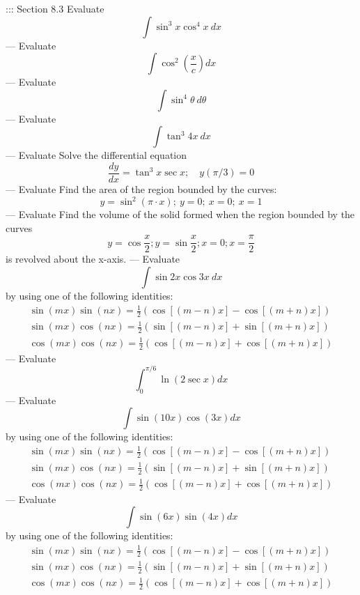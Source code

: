 ::: Section 8.3
Evaluate
\[\int\sin^3 x\cos^4 x\ dx\]
---
Evaluate
\[\int\cos^2\left(\frac{x}{c}\right)dx\]
---
Evaluate
\[\int\sin^4\theta\ d\theta\]
---
Evaluate
\[\int\tan^3 4x\ dx\]
---
Evaluate
Solve the differential equation
\[\frac{dy}{dx}=\tan^3 x\sec x;\quad y(\pi/3)=0\]
---
Evaluate
Find the area of the region bounded by the curves:
\[y=\sin^2(\pi\cdot x);\ y=0;\ x=0;\ x=1\]
---
Evaluate
Find the volume of the solid formed when the region bounded by the curves
\[y=\cos\frac{x}{2};y=\sin\frac{x}{2};x=0;x=\frac{\pi}{2}\]
is revolved about the x-axis.
---
Evaluate
\[\int\sin 2x\cos 3x\ dx\]
by using one of the following identities:
\begin{gather*}
\sin(mx)\sin(nx)=\frac{1}{2}(\cos[(m-n)x]-\cos[(m+n)x])\\
\sin(mx)\cos(nx)=\frac{1}{2}(\sin[(m-n)x]+\sin[(m+n)x])\\
\cos(mx)\cos(nx)=\frac{1}{2}(\cos[(m-n)x]+\cos[(m+n)x])
\end{gather*}
---
Evaluate
\[\int_0^{\pi/6}\ln(2\sec x)dx\]
---
Evaluate
\[\int\sin(10x)\cos(3x)dx\]
by using one of the following identities:
\begin{gather*}
\sin(mx)\sin(nx)=\frac{1}{2}(\cos[(m-n)x]-\cos[(m+n)x])\\
\sin(mx)\cos(nx)=\frac{1}{2}(\sin[(m-n)x]+\sin[(m+n)x])\\
\cos(mx)\cos(nx)=\frac{1}{2}(\cos[(m-n)x]+\cos[(m+n)x])
\end{gather*}
---
Evaluate
\[\int\sin(6x)\sin(4x)dx\]
by using one of the following identities:
\begin{gather*}
\sin(mx)\sin(nx)=\frac{1}{2}(\cos[(m-n)x]-\cos[(m+n)x])\\
\sin(mx)\cos(nx)=\frac{1}{2}(\sin[(m-n)x]+\sin[(m+n)x])\\
\cos(mx)\cos(nx)=\frac{1}{2}(\cos[(m-n)x]+\cos[(m+n)x])
\end{gather*}
